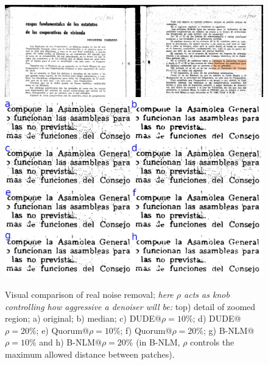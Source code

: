 \documentclass{article}
\begin{document}
\begin{figure}
    \centering
    \includegraphics[width=0.9\columnwidth]{r0108_0022_crop.png}\\[2ex]
    \includegraphics[width=0.9\columnwidth]{asamblea2.png}
    \caption{\label{fig:visual-real} Visual comparison of real noise removal; \emph{here $\rho$ acts as knob controlling how aggressive a denoiser will be:} top) detail of zoomed region;  a) original; b) median; c) DUDE@$\rho=10\%$; d) DUDE@$\rho=20\%$; e) Quorum@$\rho=10\%$; f) Quorum@$\rho=20\%$; g) B-NLM@$\rho=10\%$ and h) B-NLM@$\rho=20\%$ (in B-NLM, $\rho$ controls the maximum allowed distance between patches). }    
\end{figure}
%
\def\good{\color{blue}}%
\def\bad{\color{red}}%
%
\end{document}
